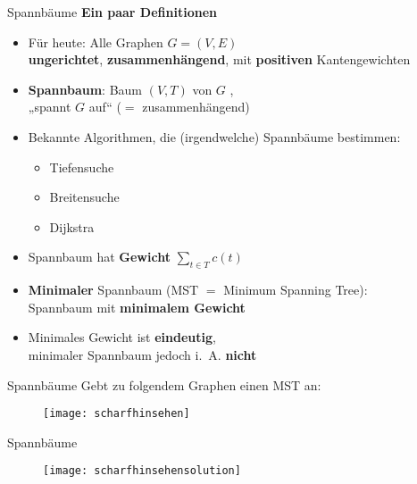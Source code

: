 
\begin{frame}{Spannbäume}
	\textbf{Ein paar Definitionen} 
	\begin{itemize}
		\item Für heute: Alle Graphen $G = (V, E)$ \\ 
		\textbf{ungerichtet}, \textbf{zusammenhängend}, mit \textbf{positiven} Kantengewichten
		\pause
		\item \textbf{Spannbaum}: Baum $(V, T)$ von $G$ , \\
		„spannt $G$ auf“ ($=$ zusammenhängend)
		\pause
		\item Bekannte Algorithmen, die (irgendwelche) Spannbäume bestimmen:
		\begin{itemize}
			\item Tiefensuche
			\item Breitensuche
			\item Dijkstra
		\end{itemize}
		\pause
		\item Spannbaum hat \textbf{Gewicht} $ \sum\limits_{t \in T} c(t)$
		\pause
		\item \textbf{Minimaler} Spannbaum (MST $=$ Minimum Spanning Tree): \\ Spannbaum mit \textbf{minimalem Gewicht}
		\pause
		\item Minimales Gewicht ist \textbf{eindeutig}, \\
		minimaler Spannbaum jedoch i.~A. \textbf{nicht}
	\end{itemize}
\end{frame}


\begin{frame}[t]{Spannbäume}
	Gebt zu folgendem Graphen einen MST an: \\
	\begin{figure}[htp]
		\centering
		\texttt{[image: scharfhinsehen]}
	\end{figure}
\end{frame}

\begin{frame}[t]{Spannbäume}
	\solutionheading
	\medskip
	\begin{figure}[htp]
		\centering
		\texttt{[image: scharfhinsehensolution]}
	\end{figure}
\end{frame}

